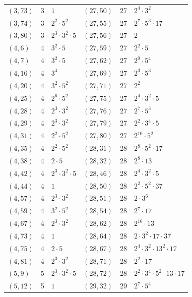 \documentclass[11pt]{article}
\begin{document}
\begin{longtable}{@{}lrl@{\qquad}lrl@{}}
$(3,73)$ & 3 & $1$ & $(27,50)$ & 27 & $2^{4}\cdot 3^{2}$\\
$(3,74)$ & 3 & $2^{2}\cdot 5^{2}$ & $(27,55)$ & 27 & $2^{7}\cdot 5^{3}\cdot 17$\\
$(3,80)$ & 3 & $2^{3}\cdot 3^{2}\cdot 5$ & $(27,56)$ & 27 & $2$\\
$(4,6)$ & 4 & $3^{2}\cdot 5$ & $(27,59)$ & 27 & $2^{2}\cdot 5$\\
$(4,7)$ & 4 & $3^{2}\cdot 5$ & $(27,62)$ & 27 & $2^{9}\cdot 5^{4}$\\
$(4,16)$ & 4 & $3^{4}$ & $(27,69)$ & 27 & $2^{3}\cdot 5^{3}$\\
$(4,20)$ & 4 & $3^{2}\cdot 5^{2}$ & $(27,71)$ & 27 & $2^{2}$\\
$(4,25)$ & 4 & $2^{6}\cdot 5^{2}$ & $(27,75)$ & 27 & $2^{4}\cdot 3^{2}\cdot 5$\\
$(4,28)$ & 4 & $2^{3}\cdot 3^{2}$ & $(27,76)$ & 27 & $2^{7}\cdot 5^{3}$\\
$(4,29)$ & 4 & $2^{3}\cdot 3^{2}$ & $(27,79)$ & 27 & $2^{2}\cdot 3^{4}\cdot 5$\\
$(4,31)$ & 4 & $2^{2}\cdot 5^{2}$ & $(27,80)$ & 27 & $2^{10}\cdot 5^{2}$\\
$(4,35)$ & 4 & $2^{2}\cdot 5^{2}$ & $(28,31)$ & 28 & $2^{8}\cdot 5^{2}\cdot 17$\\
$(4,38)$ & 4 & $2\cdot 5$ & $(28,32)$ & 28 & $2^{8}\cdot 13$\\
$(4,42)$ & 4 & $2^{3}\cdot 3^{2}\cdot 5$ & $(28,46)$ & 28 & $2^{4}\cdot 3^{2}\cdot 5$\\
$(4,44)$ & 4 & $1$ & $(28,50)$ & 28 & $2^{2}\cdot 5^{2}\cdot 37$\\
$(4,57)$ & 4 & $2^{3}\cdot 3^{2}$ & $(28,51)$ & 28 & $2\cdot 3^{6}$\\
$(4,59)$ & 4 & $3^{2}\cdot 5^{2}$ & $(28,54)$ & 28 & $2^{7}\cdot 17$\\
$(4,67)$ & 4 & $2^{3}\cdot 3^{2}$ & $(28,62)$ & 28 & $2^{16}\cdot 13$\\
$(4,73)$ & 4 & $1$ & $(28,64)$ & 28 & $2\cdot 3^{2}\cdot 17\cdot 37$\\
$(4,75)$ & 4 & $2\cdot 5$ & $(28,67)$ & 28 & $2^{4}\cdot 3^{2}\cdot 13^{2}\cdot 17$\\
$(4,81)$ & 4 & $2^{3}\cdot 3^{2}$ & $(28,71)$ & 28 & $2^{2}\cdot 17$\\
$(5,9)$ & 5 & $2^{3}\cdot 3^{2}\cdot 5$ & $(28,72)$ & 28 & $2^{2}\cdot 3^{4}\cdot 5^{2}\cdot 13\cdot 17$\\
$(5,12)$ & 5 & $1$ & $(29,32)$ & 29 & $2^{7}\cdot 5^{4}$\\

\end{longtable}
\end{document}
